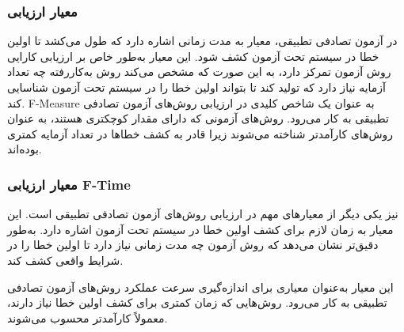 \subsubsection{معیار ارزیابی }

در آزمون تصادفی تطبیقی، معیار  به مدت زمانی اشاره دارد که طول می‌کشد تا اولین خطا در سیستم تحت آزمون کشف شود. این معیار به‌طور خاص بر ارزیابی کارایی روش آزمون تمرکز دارد، به این صورت که مشخص می‌کند روش به‌کاررفته چه تعداد آزمایه نیاز دارد که تولید کند تا بتواند اولین خطا را در سیستم تحت آزمون شناسایی کند. F-Measure به عنوان یک شاخص کلیدی در ارزیابی روش‌های آزمون تصادفی تطبیقی به کار می‌رود. روش‌های آزمونی که دارای مقدار  کوچکتری هستند، به عنوان روش‌های کارآمدتر شناخته می‌شوند زیرا قادر به کشف خطاها در تعداد آزمایه کمتری بوده‌اند.

\subsubsection{معیار ارزیابی F-Time}

 نیز یکی دیگر از معیارهای مهم در ارزیابی روش‌های آزمون تصادفی تطبیقی است. این معیار به زمان لازم برای کشف اولین خطا در سیستم تحت آزمون اشاره دارد.  به‌طور دقیق‌تر نشان می‌دهد که روش آزمون چه مدت زمانی نیاز دارد تا اولین خطا را در شرایط واقعی کشف کند.

این معیار به‌عنوان معیاری برای اندازه‌گیری سرعت عملکرد روش‌های آزمون تصادفی تطبیقی به کار می‌رود. روش‌هایی که زمان کمتری برای کشف اولین خطا نیاز دارند، معمولاً کارآمدتر محسوب می‌شوند.


%
%
